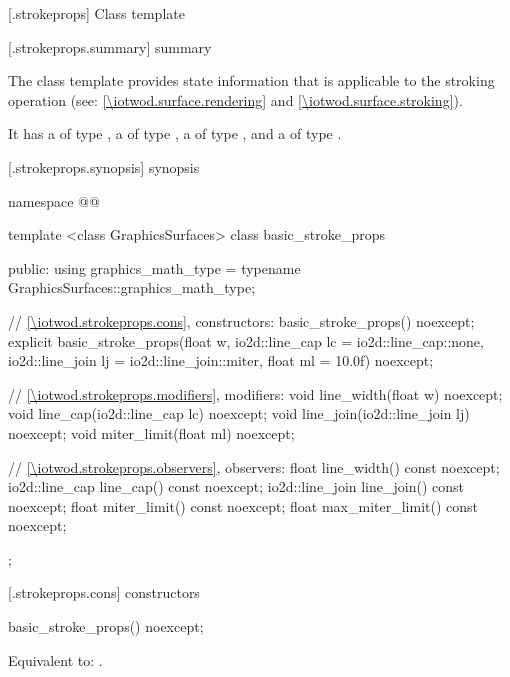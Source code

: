 
 [\iotwod.strokeprops] {Class template }

 [\iotwod.strokeprops.summary] { summary}

\pnum
The  class template provides state information that is applicable to the stroking operation (see: \ref{\iotwod.surface.rendering} and \ref{\iotwod.surface.stroking}).

\pnum
It has a  of type , a  of type , a  of type , and a  of type .

 [\iotwod.strokeprops.synopsis] { synopsis}

\begin{codeblock}
namespace @\fullnamespace{}@ {
  template <class GraphicsSurfaces>
  class basic_stroke_props {
  public:
	using graphics_math_type = typename GraphicsSurfaces::graphics_math_type;

    // \ref{\iotwod.strokeprops.cons}, constructors:
    basic_stroke_props() noexcept;
    explicit basic_stroke_props(float w, io2d::line_cap lc = io2d::line_cap::none,
      io2d::line_join lj = io2d::line_join::miter, float ml = 10.0f) noexcept;

    // \ref{\iotwod.strokeprops.modifiers}, modifiers:
    void line_width(float w) noexcept;
    void line_cap(io2d::line_cap lc) noexcept;
    void line_join(io2d::line_join lj) noexcept;
    void miter_limit(float ml) noexcept;

    // \ref{\iotwod.strokeprops.observers}, observers:
    float line_width() const noexcept;
    io2d::line_cap line_cap() const noexcept;
    io2d::line_join line_join() const noexcept;
    float miter_limit() const noexcept;
    float max_miter_limit() const noexcept;
  };
}
\end{codeblock}

 [\iotwod.strokeprops.cons] { constructors}

%
\begin{itemdecl}
basic_stroke_props() noexcept;
\end{itemdecl}
\begin{itemdescr}
\pnum
\effects
Equivalent to: .
\end{itemdescr}

